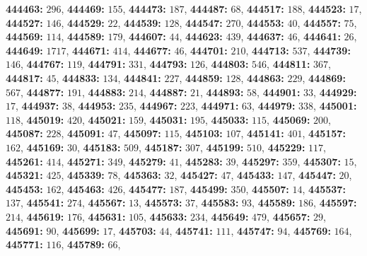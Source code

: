 \textsf{\bfseries 444463:} $296$, \textsf{\bfseries 444469:} $155$, \textsf{\bfseries 444473:} $187$, \textsf{\bfseries 444487:} $68$, \textsf{\bfseries 444517:} $188$, \textsf{\bfseries 444523:} $17$, \textsf{\bfseries 444527:} $146$, \textsf{\bfseries 444529:} $22$, \textsf{\bfseries 444539:} $128$, \textsf{\bfseries 444547:} $270$, \textsf{\bfseries 444553:} $40$, \textsf{\bfseries 444557:} $75$, \textsf{\bfseries 444569:} $114$, \textsf{\bfseries 444589:} $179$, \textsf{\bfseries 444607:} $44$, \textsf{\bfseries 444623:} $439$, \textsf{\bfseries 444637:} $46$, \textsf{\bfseries 444641:} $26$, \textsf{\bfseries 444649:} $1717$, \textsf{\bfseries 444671:} $414$, \textsf{\bfseries 444677:} $46$, \textsf{\bfseries 444701:} $210$, \textsf{\bfseries 444713:} $537$, \textsf{\bfseries 444739:} $146$, \textsf{\bfseries 444767:} $119$, \textsf{\bfseries 444791:} $331$, \textsf{\bfseries 444793:} $126$, \textsf{\bfseries 444803:} $546$, \textsf{\bfseries 444811:} $367$, \textsf{\bfseries 444817:} $45$, \textsf{\bfseries 444833:} $134$, \textsf{\bfseries 444841:} $227$, \textsf{\bfseries 444859:} $128$, \textsf{\bfseries 444863:} $229$, \textsf{\bfseries 444869:} $567$, \textsf{\bfseries 444877:} $191$, \textsf{\bfseries 444883:} $214$, \textsf{\bfseries 444887:} $21$, \textsf{\bfseries 444893:} $58$, \textsf{\bfseries 444901:} $33$, \textsf{\bfseries 444929:} $17$, \textsf{\bfseries 444937:} $38$, \textsf{\bfseries 444953:} $235$, \textsf{\bfseries 444967:} $223$, \textsf{\bfseries 444971:} $63$, \textsf{\bfseries 444979:} $338$, \textsf{\bfseries 445001:} $118$, \textsf{\bfseries 445019:} $420$, \textsf{\bfseries 445021:} $159$, \textsf{\bfseries 445031:} $195$, \textsf{\bfseries 445033:} $115$, \textsf{\bfseries 445069:} $200$, \textsf{\bfseries 445087:} $228$, \textsf{\bfseries 445091:} $47$, \textsf{\bfseries 445097:} $115$, \textsf{\bfseries 445103:} $107$, \textsf{\bfseries 445141:} $401$, \textsf{\bfseries 445157:} $162$, \textsf{\bfseries 445169:} $30$, \textsf{\bfseries 445183:} $509$, \textsf{\bfseries 445187:} $307$, \textsf{\bfseries 445199:} $510$, \textsf{\bfseries 445229:} $117$, \textsf{\bfseries 445261:} $414$, \textsf{\bfseries 445271:} $349$, \textsf{\bfseries 445279:} $41$, \textsf{\bfseries 445283:} $39$, \textsf{\bfseries 445297:} $359$, \textsf{\bfseries 445307:} $15$, \textsf{\bfseries 445321:} $425$, \textsf{\bfseries 445339:} $78$, \textsf{\bfseries 445363:} $32$, \textsf{\bfseries 445427:} $47$, \textsf{\bfseries 445433:} $147$, \textsf{\bfseries 445447:} $20$, \textsf{\bfseries 445453:} $162$, \textsf{\bfseries 445463:} $426$, \textsf{\bfseries 445477:} $187$, \textsf{\bfseries 445499:} $350$, \textsf{\bfseries 445507:} $14$, \textsf{\bfseries 445537:} $137$, \textsf{\bfseries 445541:} $274$, \textsf{\bfseries 445567:} $13$, \textsf{\bfseries 445573:} $37$, \textsf{\bfseries 445583:} $93$, \textsf{\bfseries 445589:} $186$, \textsf{\bfseries 445597:} $214$, \textsf{\bfseries 445619:} $176$, \textsf{\bfseries 445631:} $105$, \textsf{\bfseries 445633:} $234$, \textsf{\bfseries 445649:} $479$, \textsf{\bfseries 445657:} $29$, \textsf{\bfseries 445691:} $90$, \textsf{\bfseries 445699:} $17$, \textsf{\bfseries 445703:} $44$, \textsf{\bfseries 445741:} $111$, \textsf{\bfseries 445747:} $94$, \textsf{\bfseries 445769:} $164$, \textsf{\bfseries 445771:} $116$, \textsf{\bfseries 445789:} $66$, 
